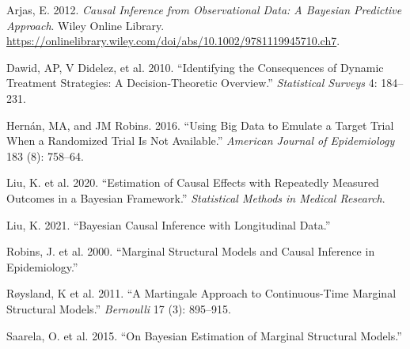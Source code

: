 \label{refs}
\begin{CSLReferences}{1}{0}
Arjas, E. 2012. \emph{Causal Inference from Observational Data: A Bayesian Predictive Approach}. Wiley Online Library. \url{https://onlinelibrary.wiley.com/doi/abs/10.1002/9781119945710.ch7}.

Dawid, AP, V Didelez, et al. 2010. {``Identifying the Consequences of Dynamic Treatment Strategies: A Decision-Theoretic Overview.''} \emph{Statistical Surveys} 4: 184--231.

Hernán, MA, and JM Robins. 2016. {``Using Big Data to Emulate a Target Trial When a Randomized Trial Is Not Available.''} \emph{American Journal of Epidemiology} 183 (8): 758--64.

Liu, K. et al. 2020. {``Estimation of Causal Effects with Repeatedly Measured Outcomes in a Bayesian Framework.''} \emph{Statistical Methods in Medical Research}.

Liu, K. 2021. {``Bayesian Causal Inference with Longitudinal Data.''}

Robins, J. et al. 2000. {``Marginal Structural Models and Causal Inference in Epidemiology.''}

Røysland, K et al. 2011. {``A Martingale Approach to Continuous-Time Marginal Structural Models.''} \emph{Bernoulli} 17 (3): 895--915.

Saarela, O. et al. 2015. {``On Bayesian Estimation of Marginal Structural Models.''}

\end{CSLReferences}


\address{%
Xiao Yan\\
Dalla Lana School of Public Health, University of Toronto\\%
Department of Biostatistics\\ Toronto, Canada\\
%
\url{https://github.com/XiaoYan-Clarence}\\%
\textit{ORCiD: \href{https://orcid.org/0000-1721-1511-1101 (?)}{0000-1721-1511-1101 (?)}}\\%
\href{mailto:Clarence.YXA@gmail.com}{\nolinkurl{Clarence.YXA@gmail.com}}%
}

\address{%
Kuan Liu\\
Dalla Lana School of Public Health, University of Toronto\\%
Department of Biostatistics, Toronto, Canada\\ Institute of Health Policy, Management and Evaluation, Toronto, Canada\\
%
\url{https://www.kuan-liu.com/}\\%
\textit{ORCiD: \href{https://orcid.org/0000-0002-5017-1276}{0000-0002-5017-1276}}\\%
\href{mailto:kuan.liu@utoronto.ca}{\nolinkurl{kuan.liu@utoronto.ca}}%
}
